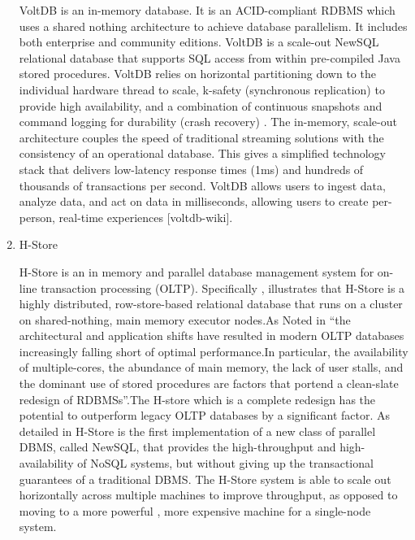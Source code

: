 \begin{enumerate}
VoltDB is an in-memory database. It is an ACID-compliant RDBMS
which uses a shared nothing architecture to achieve database
parallelism. It includes both enterprise and community
editions. VoltDB is a scale-out NewSQL relational database that
supports SQL access from within pre-compiled Java stored
procedures.  VoltDB relies on horizontal partitioning down to the
individual hardware thread to scale, k-safety (synchronous
replication) to provide high availability, and a combination of
continuous snapshots and command logging for durability (crash
recovery) \label{\detokenize{i524/technologies:id348}}{\hyperref[\detokenize{i524/technologies:voltdb-www}]{\sphinxcrossref{{[}298{]}}}}. The in-memory, scale-out
architecture couples the speed of traditional streaming solutions
with the consistency of an operational database. This gives a
simplified technology stack that delivers low-latency response
times (1ms) and hundreds of thousands of transactions per
second. VoltDB allows users to ingest data, analyze data, and act
on data in milliseconds, allowing users to create per-person,
real-time experiences {[}voltdb-wiki{]}.

\item {} 
H-Store

H-Store is an in memory and parallel database management system
for on-line transaction processing (OLTP). Specifically ,
\label{\detokenize{i524/technologies:id350}}{\hyperref[\detokenize{i524/technologies:www-hstore}]{\sphinxcrossref{{[}299{]}}}} illustrates that H-Store is a highly
distributed, row-store-based relational database that runs on a
cluster on shared-nothing, main memory executor nodes.As Noted in
\label{\detokenize{i524/technologies:id351}}{\hyperref[\detokenize{i524/technologies:kallman2008}]{\sphinxcrossref{{[}300{]}}}} ``the architectural and application shifts
have resulted in modern OLTP databases increasingly falling short
of optimal performance.In particular, the availability of
multiple-cores, the abundance of main memory, the lack of user
stalls, and the dominant use of stored procedures are factors
that portend a clean-slate redesign of RDBMSs''.The H-store which
is a complete redesign has the potential to outperform legacy
OLTP databases by a significant factor.  As detailed in
\label{\detokenize{i524/technologies:id352}}{\hyperref[\detokenize{i524/technologies:www-hstorewiki}]{\sphinxcrossref{{[}301{]}}}} H-Store is the first implementation of a
new class of parallel DBMS, called NewSQL, that provides the
high-throughput and high-availability of NoSQL systems, but
without giving up the transactional guarantees of a traditional
DBMS.  The H-Store system is able to scale out horizontally
across multiple machines to improve throughput, as opposed to
moving to a more powerful , more expensive machine for a
single-node system.

\end{enumerate}


